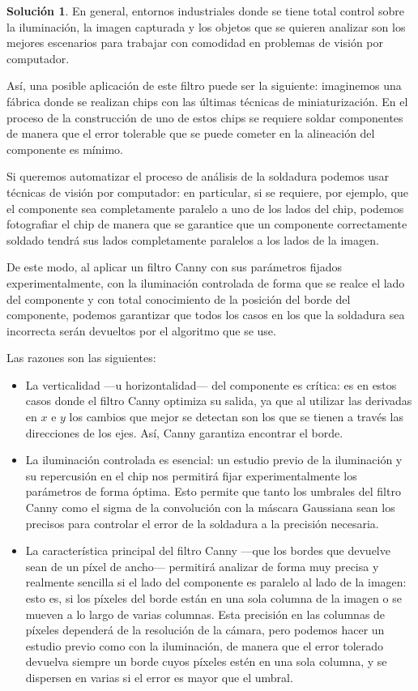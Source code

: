 \documentclass[a4paper, 11pt]{article}
\theoremstyle{definition}
\newtheorem*{solucion}{Solución}
\theoremstyle{theorem}
\begin{document}
  \begin{solucion}
      En general, entornos industriales donde se tiene total control sobre la iluminación, la imagen capturada y los objetos que se quieren analizar son los mejores escenarios para trabajar con comodidad en problemas de visión por computador.

      Así, una posible aplicación de este filtro puede ser la siguiente: imaginemos una fábrica donde se realizan chips con las últimas técnicas de miniaturización. En el proceso de la construcción de uno de estos chips se requiere soldar componentes de manera que el error tolerable que se puede cometer en la alineación del componente es mínimo.

      Si queremos automatizar el proceso de análisis de la soldadura podemos usar técnicas de visión por computador: en particular, si se requiere, por ejemplo, que el componente sea completamente paralelo a uno de los lados del chip, podemos fotografiar el chip de manera que se garantice que un componente correctamente soldado tendrá sus lados completamente paralelos a los lados de la imagen.

      De este modo, al aplicar un filtro Canny con sus parámetros fijados experimentalmente, con la iluminación controlada de forma que se realce el lado del componente y con total conocimiento de la posición del borde del componente, podemos garantizar que todos los casos en los que la soldadura sea incorrecta serán devueltos por el algoritmo que se use.

      Las razones son las siguientes:
      \begin{itemize}
          \item La verticalidad ---u horizontalidad--- del componente es crítica: es en estos casos donde el filtro Canny optimiza su salida, ya que al utilizar las derivadas en $x$ e $y$ los cambios que mejor se detectan son los que se tienen a través las direcciones de los ejes. Así, Canny garantiza encontrar el borde.
          \item La iluminación controlada es esencial: un estudio previo de la iluminación y su repercusión en el chip nos permitirá fijar experimentalmente los parámetros de forma óptima. Esto permite que tanto los umbrales del filtro Canny como el sigma de la convolución con la máscara Gaussiana sean los precisos para controlar el error de la soldadura a la precisión necesaria.
          \item La característica principal del filtro Canny ---que los bordes que devuelve sean de un píxel de ancho--- permitirá analizar de forma muy precisa y realmente sencilla si el lado del componente es paralelo al lado de la imagen: esto es, si los píxeles del borde están en una sola columna de la imagen o se mueven a lo largo de varias columnas. Esta precisión en las columnas de píxeles dependerá de la resolución de la cámara, pero podemos hacer un estudio previo como con la iluminación, de manera que el error tolerado devuelva siempre un borde cuyos píxeles estén en una sola columna, y se dispersen en varias si el error es mayor que el umbral.
      \end{itemize}


\end{solucion}
\end{document}
